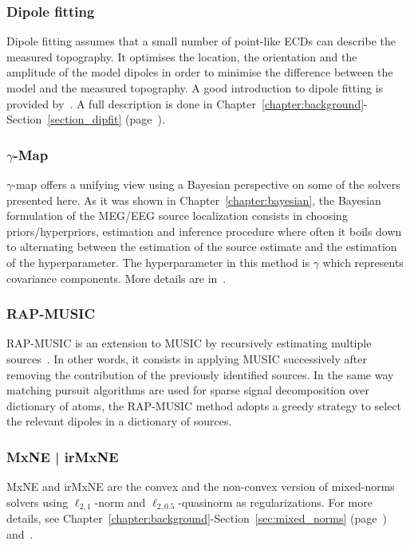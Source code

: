 \subsubsection{Dipole fitting}
Dipole fitting assumes that a small number of point-like \ac{ECD}s can describe the measured topography. It optimises the location, the orientation and the amplitude of the model dipoles in order to minimise the difference between the model and the measured topography. A good introduction to dipole fitting is provided by~\cite{scherg1990fundamentals}. A full description is done in Chapter~\ref{chapter:background}-Section~\ref{section_dipfit} (page~\pageref{section_dipfit}).

\subsubsection{$\gamma$-Map}
$\gamma$-map offers a unifying view using a Bayesian perspective on some of the solvers presented here. As it was shown in Chapter~\ref{chapter:bayesian}, the Bayesian formulation of the MEG/EEG source localization consists in choosing priors/hyperpriors, estimation and inference procedure where often it boils down to alternating between the estimation of the source estimate and the estimation of the hyperparameter. The hyperparameter in this method is $\gamma$ which represents covariance components. More details are in~\cite{Wipf-Nagarajan:2009}.

\subsubsection{RAP-MUSIC}
\Ac{RAP-MUSIC} is an extension to \ac{MUSIC} by recursively estimating multiple sources~\cite{mosher1997source,mosher1999source}. In other words, it consists in applying MUSIC successively after removing the contribution of the previously identified sources. In the same way matching pursuit algorithms are used for sparse signal decomposition over dictionary of atoms, the RAP-MUSIC method adopts a greedy strategy to select the relevant dipoles in a dictionary of sources.

\subsubsection{MxNE | irMxNE}
\Ac{MxNE} and \ac{irMxNE} are the convex and the non-convex version of mixed-norms solvers using $\ell_{2,1}$-norm and $\ell_{2,0.5}$-quasinorm as regularizations. For more details, see Chapter~\ref{chapter:background}-Section~\ref{sec:mixed_norms} (page~\pageref{sec:mixed_norms}) and~\cite{gramfort2012mixed,strohmeier-etal:16}.

